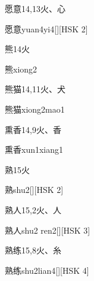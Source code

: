 \begin{entry}{愿意}{14,13}{⽕、⼼}
  \begin{phonetics}{愿意}{yuan4yi4}[][HSK 2]
  \end{phonetics}
\end{entry}

\begin{entry}{熊}{14}{⽕}
  \begin{phonetics}{熊}{xiong2}
  \end{phonetics}
\end{entry}

\begin{entry}{熊猫}{14,11}{⽕、⽝}
  \begin{phonetics}{熊猫}{xiong2mao1}
  \end{phonetics}
\end{entry}

\begin{entry}{熏香}{14,9}{⽕、⾹}
  \begin{phonetics}{熏香}{xun1xiang1}
  \end{phonetics}
\end{entry}

\begin{entry}{熟}{15}{⽕}
  \begin{phonetics}{熟}{shu2}[][HSK 2]
  \end{phonetics}
\end{entry}

\begin{entry}{熟人}{15,2}{⽕、⼈}
  \begin{phonetics}{熟人}{shu2 ren2}[][HSK 3]
  \end{phonetics}
\end{entry}

\begin{entry}{熟练}{15,8}{⽕、⽷}
  \begin{phonetics}{熟练}{shu2lian4}[][HSK 4]
  \end{phonetics}
\end{entry}

